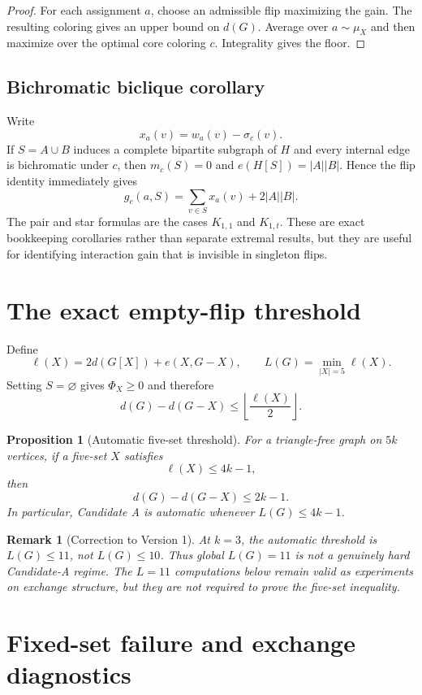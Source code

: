 \documentclass[11pt]{article}
\newtheorem{proposition}{Proposition}
\newtheorem{remark}{Remark}
\newcommand{\dd}{d}
\begin{document}
\begin{proof}
For each assignment $a$, choose an admissible flip maximizing the gain.
The resulting coloring gives an upper bound on $\dd(G)$.  Average over
$a\sim\mu_X$ and then maximize over the optimal core coloring $c$.
Integrality gives the floor.
\end{proof}

\subsection{Bichromatic biclique corollary}

Write
\[
x_a(v)=w_a(v)-\sigma_c(v).
\]
If $S=A\cup B$ induces a complete bipartite subgraph of $H$ and every
internal edge is bichromatic under $c$, then $m_c(S)=0$ and
$e(H[S])=|A||B|$.  Hence the flip identity immediately gives
\[
\boxed{
 g_c(a,S)=\sum_{v\in S}x_a(v)+2|A||B|.
}
\]
The pair and star formulas are the cases $K_{1,1}$ and $K_{1,t}$.
These are exact bookkeeping corollaries rather than separate extremal
results, but they are useful for identifying interaction gain that is
invisible in singleton flips.

\section{The exact empty-flip threshold}

Define
\[
\ell(X)=2\dd(G[X])+e(X,G-X),
\qquad
L(G)=\min_{|X|=5}\ell(X).
\]
Setting $S=\varnothing$ gives $\Phi_X\ge0$ and therefore
\[
\dd(G)-\dd(G-X)
\le
\left\lfloor\frac{\ell(X)}2\right\rfloor.
\]

\begin{proposition}[Automatic five-set threshold]
For a triangle-free graph on $5k$ vertices, if a five-set $X$ satisfies
\[
\ell(X)\le 4k-1,
\]
then
\[
\dd(G)-\dd(G-X)\le2k-1.
\]
In particular, Candidate A is automatic whenever $L(G)\le4k-1$.
\end{proposition}

\begin{remark}[Correction to Version 1]
At $k=3$, the automatic threshold is $L(G)\le11$, not $L(G)\le10$.
Thus global $L(G)=11$ is not a genuinely hard Candidate-A regime.  The
$L=11$ computations below remain valid as experiments on exchange
structure, but they are not required to prove the five-set inequality.
\end{remark}

\section{Fixed-set failure and exchange diagnostics}
\end{document}
